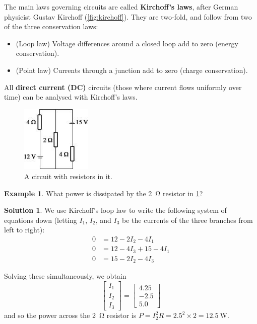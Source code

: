 \documentclass[a4paper]{amsbook}
\theoremstyle{definition}
\newtheorem*{example}{Example}
\numberwithin{exercise}{chapter}
\numberwithin{exercise}{chapter}
\newtheorem*{solution}{Solution}
\begin{document}
The main laws governing circuits are called \textbf{Kirchoff's laws}, after German physicist Gustav Kirchoff (\cref{fig:kirchoff}). They
are two-fold, and follow from two of the three conservation laws:
\begin{itemize}
  \item (Loop law) Voltage differences around a closed loop add to zero (energy conservation).
  \item (Point law) Currents through a junction add to zero (charge conservation).
\end{itemize}

All \textbf{direct current (DC)} circuits (those where current flows uniformly over time) can be analysed with Kirchoff's laws.

\begin{figure}
  \centering
  \includegraphics[width=0.3\textwidth]{circuit}
  \caption{A circuit with resistors in it.}\label{fig:circuit}
\end{figure}

\begin{example}
  What power is dissipated by the \SI{2}{\ohm} resistor in \cref{fig:circuit}?
\end{example}

\begin{solution}
  We use Kirchoff's loop law to write the following system of equations down (letting $ I_1 $, $ I_2 $, and $ I_3 $ be the currents of the
  three branches from left to right):
  \begin{align*}
    0 &= 12 - 2I_2 - 4I_1\\
    0 &= 12 - 4I_3 + 15 - 4I_1\\
    0 &= 15 - 2I_2 - 4I_3
  \end{align*}

  Solving these simultaneously, we obtain
  \begin{displaymath}
    \begin{bmatrix}
      I_1 \\ I_2 \\ I_3
    \end{bmatrix}
    =
    \begin{bmatrix}
      4.25\\-2.5\\5.0
    \end{bmatrix}
  \end{displaymath}
  and so the power across the \SI{2}{\ohm} resistor is $ P = I_2^2 R = 2.5^2 \times 2 = \SI{12.5}{\watt} $.
\end{solution}
\end{document}
